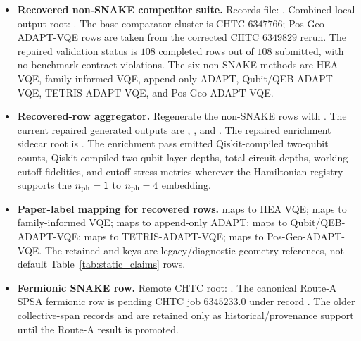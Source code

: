 \documentclass[
  reprint,
  amsmath,
  amssymb,
  aps,
  pra,
  nofootinbib,
  superscriptaddress,
  floatfix
]{revtex4-2}
\begin{document}
\begin{itemize}
\item \textbf{Recovered non-SNAKE competitor suite.} Records file: . Combined local output root: . The base comparator cluster is CHTC $6347766$; Pos-Geo-ADAPT-VQE rows are taken from the corrected CHTC $6349829$ rerun. The repaired validation status is $108$ completed rows out of $108$ submitted, with no benchmark contract violations. The six non-SNAKE methods are HEA VQE, family-informed VQE, append-only ADAPT, Qubit/QEB-ADAPT-VQE, TETRIS-ADAPT-VQE, and Pos-Geo-ADAPT-VQE.
\item \textbf{Recovered-row aggregator.} Regenerate the non-SNAKE rows with . The current repaired generated outputs are , , and . The repaired enrichment sidecar root is . The enrichment pass emitted Qiskit-compiled two-qubit counts, Qiskit-compiled two-qubit layer depths, total circuit depths, working-cutoff fidelities, and cutoff-stress metrics wherever the Hamiltonian registry supports the $n_{\rm ph}=1$ to $n_{\rm ph}=4$ embedding.
\item \textbf{Paper-label mapping for recovered rows.}  maps to HEA VQE;  maps to family-informed VQE;  maps to append-only ADAPT;  maps to Qubit/QEB-ADAPT-VQE;  maps to TETRIS-ADAPT-VQE;  maps to Pos-Geo-ADAPT-VQE. The retained  and  keys are legacy/diagnostic geometry references, not default Table~\ref{tab:static_claims} rows.
\item \textbf{Fermionic SNAKE row.} Remote CHTC root: . The canonical Route-A SPSA fermionic row is pending CHTC job $6345233.0$ under record . The older collective-span records  and  are retained only as historical/provenance support until the Route-A result is promoted.

\end{itemize}
\end{document}
